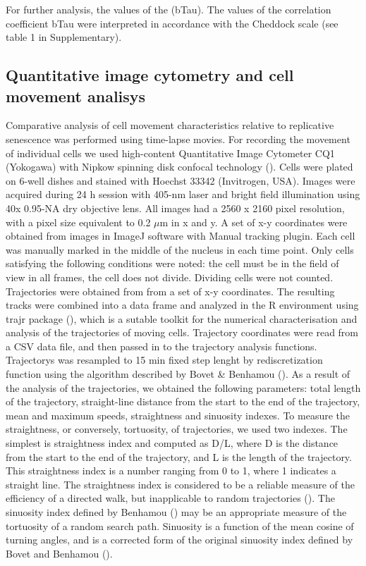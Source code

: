 \documentclass[alpha-refs]{wiley-article}
\begin{document}
For further analysis, the values of the  (bTau).
The values of the correlation coefficient bTau were interpreted in accordance with the Cheddock scale (see table 1 in Supplementary).


\subsection{Quantitative image cytometry and cell movement analisys}

Comparative analysis of cell movement characteristics relative to replicative senescence was performed using time-lapse movies.
For recording the movement of individual cells we used high-content Quantitative Image Cytometer CQ1 (Yokogawa) with Nipkow spinning disk confocal technology (\cite{sakashita2015cq1}).
Cells were plated on 6-well dishes and stained with Hoechst 33342 (Invitrogen, USA).
Images were acquired during 24 h session with 405-nm laser and bright field illumination using 40x 0.95-NA dry objective lens.
All images had a 2560 x 2160 pixel resolution, with a pixel size equivalent to 0.2 $\mu$m in x and y.
A set of x-y coordinates were obtained from images in ImageJ software with Manual tracking plugin.
Each cell was manually marked in the middle of the nucleus in each time point.
Only cells satisfying the following conditions were noted: the cell must be in the field of view in all frames, the cell does not divide.
Dividing cells were not counted.
Trajectories were obtained from from a set of x-y coordinates.
The resulting tracks were combined into a data frame and analyzed in the R environment using trajr package (\cite{mclean2018trajr}), which is a sutable toolkit for the numerical characterisation and analysis of the trajectories of moving cells.
Trajectory coordinates were read from a CSV data file, and then passed in to the trajectory analysis functions.
Trajectorys was resampled to 15 min fixed step lenght by rediscretization function using the algorithm described by Bovet \& Benhamou (\cite{bovet1988spatial}).
As a result of the analysis of the trajectories, we obtained the following parameters: total length of the trajectory, straight-line distance from the start to the end of the trajectory, mean and maximum speeds, straightness and sinuosity indexes.
To measure the straightness, or conversely, tortuosity, of trajectories, we used two indexes.
The simplest is straightness index and computed as D/L, where D is the distance from the start to the end of the trajectory, and L is the length of the trajectory.
This straightness index is a number ranging from 0 to 1, where 1 indicates a straight line.
The straightness index is considered to be a reliable measure of the efficiency of a directed walk, but inapplicable to random trajectories (\cite{benhamou2006detecting}).
The sinuosity index defined by Benhamou (\cite{benhamou2004reliably}) may be an appropriate measure of the tortuosity of a random search path.
Sinuosity is a function of the mean cosine of turning angles, and is a corrected form of the original sinuosity index defined by Bovet and Benhamou (\cite{bovet1988spatial}).
\end{document}

